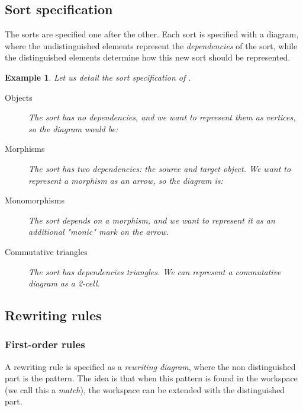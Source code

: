\documentclass{article}
\newtheorem{example}{Example}[section]
\begin{document}
\subsection{Sort specification}
The sorts are specified one after the other.
Each sort is specified with a diagram, where the undistinguished elements represent the \emph{dependencies} of the sort, 
while the distinguished elements determine how this new sort should be represented.
\begin{example}
    Let us detail the sort specification of .
    \begin{description}
        \item[Objects]
        The sort has no dependencies, and we want to represent them as vertices, so the diagram would be:
         \[
        
    \]
    \item[Morphisms]
    The sort has two dependencies: the source and target object. We want to represent a morphism as an arrow, so the diagram is:
    \[
        
    \]
    \item[Monomorphisms]
     The sort depends on a morphism, and 
     we want to represent it as an additional "monic" mark on the arrow.
    \[
        
    \]
    \item[Commutative triangles] 
     The sort has dependencies triangles. We can represent a commutative diagram as a 2-cell.
    \[
        
    \]
    \end{description}

    
\end{example}
\subsection{Rewriting rules}
\subsubsection{First-order rules}
A rewriting rule is specified as a \emph{rewriting diagram}, where the non distinguished part is the pattern. The idea is that when this pattern is found in the workspace (we call this a \emph{match}), the workspace can be extended with the distinguished part.
\end{document}
